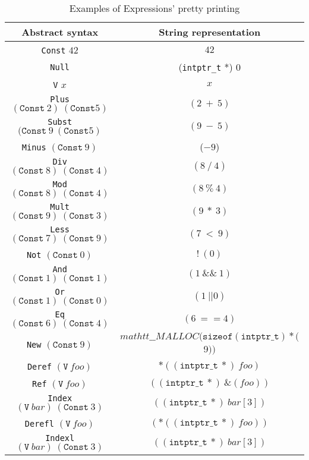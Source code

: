 \begin{table}[h!]
\centering
\begin{tabular}{|c|c|}
  \hline
  \textbf{Abstract syntax} & \textbf{String representation} \\ [0.5ex]
  \hline \hline
  \verb|Const| $42$ & $42$ \\
  \verb|Null| & (\verb|intptr_t| *) $0$ \\
  \verb|V| $x$ & $x$ \\
  \verb|Plus| $(\mathtt{Const}\ 2)\ (\mathtt{Const}5)$ & $(2\ +\ 5)$ \\
  \verb|Subst| $(\mathtt{Const}\ 9\ (\mathtt{Const}5)$ & $(9\ -\ 5)$ \\
  \verb|Minus| $(\mathtt{Const}\ 9)$ & ($-9$) \\
  \verb|Div| $(\mathtt{Const}\ 8)\ (\mathtt{Const}\ 4)$ & $(8\ /\ 4)$ \\
  \verb|Mod| $(\mathtt{Const}\ 8)\ (\mathtt{Const}\ 4)$ & $(8\ \%\ 4)$ \\
  \verb|Mult| $(\mathtt{Const}\ 9)\ (\mathtt{Const}\ 3)$ & $(9\ *\ 3)$ \\
  \verb|Less| $(\mathtt{Const}\ 7)\ (\mathtt{Const}\ 9)$ & $(7\ <\ 9)$ \\
  \verb|Not| $(\mathtt{Const}\ 0)$ & $!\ (0)$ \\
  \verb|And| $(\mathtt{Const}\ 1)\ (\mathtt{Const}\ 1)$ & $(1\ \&\&\ 1)$ \\
  \verb|Or| $(\mathtt{Const}\ 1)\ (\mathtt{Const}\ 0)$ & $(1\ || 0)$ \\
  \verb|Eq| $(\mathtt{Const}\ 6)\ (\mathtt{Const}\ 4)$ & $(6\ == 4)$ \\
  \verb|New| $(\mathtt{Const}\ 9)$ & $mathtt{\_\_MALLOC}(\mathtt{sizeof}(\mathtt{intptr\_t}) * ($9$))$ \\
  \verb|Deref| $(\mathtt{V}\ foo)$ & $*((\mathtt{intptr\_t}\ *)\ foo)$ \\
  \verb|Ref| $(\mathtt{V}\ foo)$ & $((\mathtt{intptr\_t}\ *)\ \&(foo))$ \\
  \verb|Index| $(\mathtt{V}\ bar)\ (\mathtt{Const}\ 3)$ & $((\mathtt{intptr\_t}\ *)\ bar[3])$ \\
  \verb|Derefl| $(\mathtt{V}\ foo)$ & $(*((\mathtt{intptr\_t}\ *)\ foo))$ \\
  \verb|Indexl| $(\mathtt{V}\ bar)\ (\mathtt{Const}\ 3)$ & $((\mathtt{intptr\_t}\ *)\ bar[3])$ \\
  \hline
\end{tabular}

\caption{Examples of Expressions' pretty printing}
\label{tab:pretty_expressions}
\end{table}


